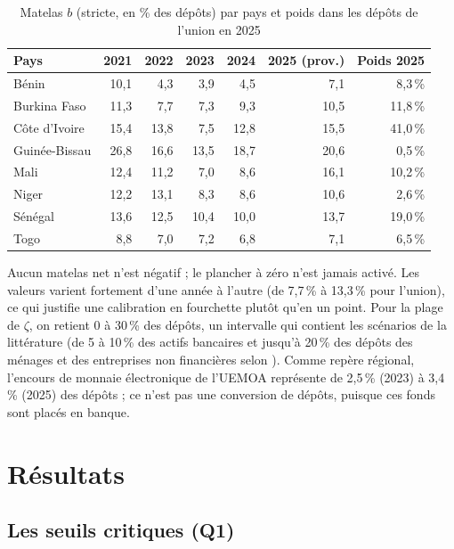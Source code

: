 \documentclass[11pt,a4paper]{article}
\begin{document}
	\begin{table}[htbp]
		\centering
		\caption{Matelas $b$ (stricte, en \% des dépôts) par pays et poids dans les dépôts de l'union en 2025}\label{tab:paysb}
		\small
		\begin{tabular}{lrrrrrr}
			\toprule
			Pays & 2021 & 2022 & 2023 & 2024 & 2025 (prov.) & Poids 2025 \\
			\midrule
			Bénin & 10,1 & 4,3 & 3,9 & 4,5 & 7,1 & 8,3\,\% \\
			Burkina Faso & 11,3 & 7,7 & 7,3 & 9,3 & 10,5 & 11,8\,\% \\
			Côte d'Ivoire & 15,4 & 13,8 & 7,5 & 12,8 & 15,5 & 41,0\,\% \\
			Guinée-Bissau & 26,8 & 16,6 & 13,5 & 18,7 & 20,6 & 0,5\,\% \\
			Mali & 12,4 & 11,2 & 7,0 & 8,6 & 16,1 & 10,2\,\% \\
			Niger & 12,2 & 13,1 & 8,3 & 8,6 & 10,6 & 2,6\,\% \\
			Sénégal & 13,6 & 12,5 & 10,4 & 10,0 & 13,7 & 19,0\,\% \\
			Togo & 8,8 & 7,0 & 7,2 & 6,8 & 7,1 & 6,5\,\% \\
			\bottomrule
		\end{tabular}
	\end{table}
	
	Aucun matelas net n'est négatif ; le plancher à zéro n'est jamais activé. Les valeurs varient fortement d'une année à l'autre (de 7,7\,\% à 13,3\,\% pour l'union), ce qui justifie une calibration en fourchette plutôt qu'en un point. Pour la plage de $\zeta$, on retient 0 à 30\,\% des dépôts, un intervalle qui contient les scénarios de la littérature (de 5 à 10\,\% des actifs bancaires et jusqu'à 20\,\% des dépôts des ménages et des entreprises non financières selon \citealp{adalid2022}). Comme repère régional, l'encours de monnaie électronique de l'UEMOA représente de 2,5\,\% (2023) à 3,4\,\% (2025) des dépôts ; ce n'est pas une conversion de dépôts, puisque ces fonds sont placés en banque.
	
	\section{Résultats}\label{sec:resultats}
	
	\subsection{Les seuils critiques (Q1)}
	
\end{document}
